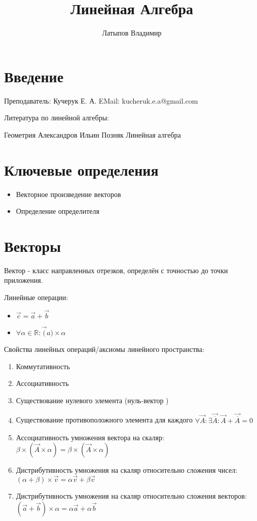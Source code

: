\documentclass[12pt, a4paper]{article}
\title{Линейная Алгебра}
\author{Латыпов Владимир}
\begin{document}
    \maketitle
    \newpage
    \tableofcontents
    \newpage

    \section{Введение}
    Преподаватель: Кучерук Е. А. 
    EMail: kucheruk.e.a@gmail.com

    Литература по линейной алгебры:

    Геометрия Александров
    Ильин Позняк  Линейная алгебра


    \section{Ключевые определения}
    \begin{itemize}
        \item Векторное произведение векторов
        \item Определение определителя
    \end{itemize}

    \section{Векторы}
    
    Вектор - класс направленных отрезков, 
    определён с точностью до точки приложения.

    Линейные операции:
    \begin{itemize}
        \item $\vec{c} = \vec{a} + \vec{b}$
        \item $\forall \alpha \in \mathbb{R}: \vec(a) \times \alpha$
    \end{itemize}

    Свойства линейных операций/аксиомы линейного пространства:
    \begin{enumerate}
        \item Коммутативность
        \item Ассоциативность
        \item Существование нулевого элемента (нуль-вектор  )
        \item Существование противоположного элемента для каждого 
                $\forall \vec{A}: \exists \vec{\overline{A}}: \vec{A} + \vec{\overline{A}} = 0$
        \item Ассоциативность умножения вектора на скаляр: $\beta \times (\vec{A} \times \alpha) = \beta \times (\vec{A} \times \alpha)$
        \item Дистрибутивность умножения на скаляр относительно сложения чисел: $(\alpha + \beta) \times \vec{v}  = \alpha \vec{v} + \beta \vec{v}$
        \item Дистрибутивность умножения на скаляр относительно сложения векторов: $(\vec{a} + \vec{b}) \times \alpha  = \alpha \vec{a} + \alpha \vec{b}$
    \end{enumerate}
    
\end{document}
